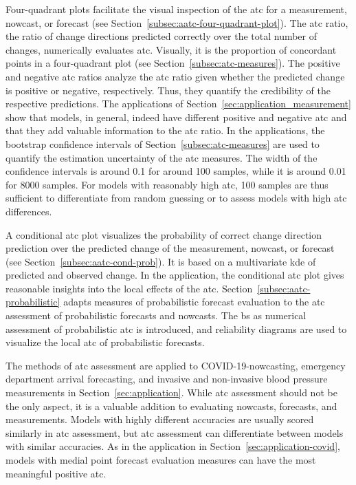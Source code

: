 \documentclass[pdflatex]{sn-jnl}
\theoremstyle{plain}%
\theoremstyle{definition}
\begin{document}
Four-quadrant plots facilitate the visual inspection of the \ac{atc} for a measurement, nowcast, or forecast (see Section~\ref{subsec:aatc-four-quadrant-plot}).
The \ac{atc} ratio, the ratio of change directions predicted correctly over the total number of changes, numerically evaluates \ac{atc}.
Visually, it is the proportion of concordant points in a four-quadrant plot (see Section~\ref{subsec:atc-measures}).
The positive and negative \ac{atc} ratios analyze the \ac{atc} ratio given whether the predicted change is positive or negative, respectively.
Thus, they quantify the credibility of the respective predictions.
The applications of Section~\ref{sec:application_measurement} show that models, in general, indeed have different positive and negative \ac{atc} and that they add valuable information to the \ac{atc} ratio.
In the applications, the bootstrap confidence intervals of Section~\ref{subsec:atc-measures} are used to quantify the estimation uncertainty of the \ac{atc} measures.
The width of the confidence intervals is around 0.1 for around 100 samples, while it is around 0.01 for 8000 samples.
For models with reasonably high \ac{atc}, 100 samples are thus sufficient to differentiate from random guessing or to assess models with high \ac{atc} differences.

A conditional \ac{atc} plot visualizes the probability of correct change direction prediction over the predicted change of the measurement, nowcast, or forecast (see Section~\ref{subsec:aatc-cond-prob}).
It is based on a multivariate \acf{kde} of predicted and observed change.
In the application, the conditional \ac{atc} plot gives reasonable insights into the local effects of the \ac{atc}.
Section~\ref{subsec:aatc-probabilistic} adapts measures of probabilistic forecast evaluation to the \ac{atc} assessment of probabilistic forecasts and nowcasts.
The \acf{bs} as numerical assessment of probabilistic \ac{atc} is introduced, and reliability diagrams are used to visualize the local \ac{atc} of probabilistic forecasts.

The methods of \ac{atc} assessment are applied to COVID-19-nowcasting, emergency department arrival forecasting, and invasive and non-invasive blood pressure measurements in Section~\ref{sec:application}.
While \ac{atc} assessment should not be the only aspect, it is a valuable addition to evaluating nowcasts, forecasts, and measurements.
Models with highly different accuracies are usually scored similarly in \ac{atc} assessment, but \ac{atc} assessment can differentiate between models with similar accuracies.
As in the application in Section~\ref{sec:application-covid}, models with medial point forecast evaluation measures can have the most meaningful positive \ac{atc}.
\end{document}
